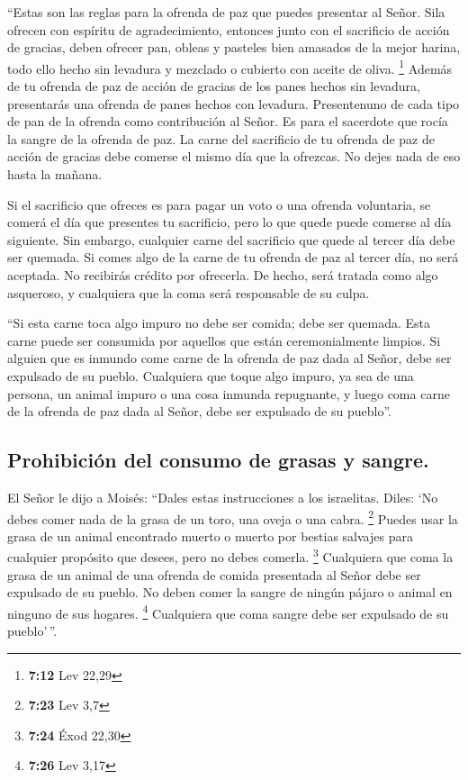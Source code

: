  ``Estas son las reglas para la ofrenda de paz que puedes
presentar al Señor.  Sila ofrecen con espíritu de
agradecimiento, entonces junto con el sacrificio de acción de gracias,
deben ofrecer pan, obleas y pasteles bien amasados de la mejor harina,
todo ello hecho sin levadura y mezclado o cubierto con aceite de oliva.
\footnote{\textbf{7:12} Lev 22,29}  Además de tu ofrenda
de paz de acción de gracias de los panes hechos sin levadura,
presentarás una ofrenda de panes hechos con levadura. 
Presentenuno de cada tipo de pan de la ofrenda como contribución al
Señor. Es para el sacerdote que rocía la sangre de la ofrenda de paz.
 La carne del sacrificio de tu ofrenda de paz de acción
de gracias debe comerse el mismo día que la ofrezcas. No dejes nada de
eso hasta la mañana.

 Si el sacrificio que ofreces es para pagar un voto o una
ofrenda voluntaria, se comerá el día que presentes tu sacrificio, pero
lo que quede puede comerse al día siguiente.  Sin
embargo, cualquier carne del sacrificio que quede al tercer día debe ser
quemada.  Si comes algo de la carne de tu ofrenda de paz
al tercer día, no será aceptada. No recibirás crédito por ofrecerla. De
hecho, será tratada como algo asqueroso, y cualquiera que la coma será
responsable de su culpa.

 ``Si esta carne toca algo impuro no debe ser comida;
debe ser quemada. Esta carne puede ser consumida por aquellos que están
ceremonialmente limpios.  Si alguien que es inmundo come
carne de la ofrenda de paz dada al Señor, debe ser expulsado de su
pueblo.  Cualquiera que toque algo impuro, ya sea de una
persona, un animal impuro o una cosa inmunda repugnante, y luego coma
carne de la ofrenda de paz dada al Señor, debe ser expulsado de su
pueblo''.

\hypertarget{prohibiciuxf3n-del-consumo-de-grasas-y-sangre.}{%
\subsection{Prohibición del consumo de grasas y
sangre.}\label{prohibiciuxf3n-del-consumo-de-grasas-y-sangre.}}

 El Señor le dijo a Moisés:  ``Dales estas
instrucciones a los israelitas. Diles: `No debes comer nada de la grasa
de un toro, una oveja o una cabra. \footnote{\textbf{7:23} Lev 3,7}
 Puedes usar la grasa de un animal encontrado muerto o
muerto por bestias salvajes para cualquier propósito que desees, pero no
debes comerla. \footnote{\textbf{7:24} Éxod 22,30} 
Cualquiera que coma la grasa de un animal de una ofrenda de comida
presentada al Señor debe ser expulsado de su pueblo.  No
deben comer la sangre de ningún pájaro o animal en ninguno de sus
hogares. \footnote{\textbf{7:26} Lev 3,17}  Cualquiera
que coma sangre debe ser expulsado de su pueblo'\,''.

